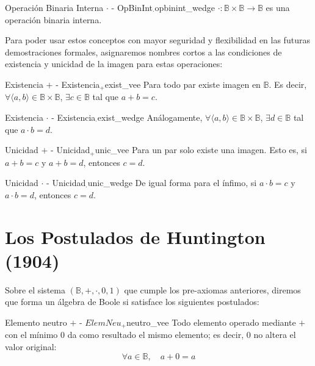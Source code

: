 \begin{preaxioma}{Operación Binaria Interna $\cdot$ - OpBinInt$_\cdot$}{opbinint_wedge}
$\cdot : \mathbb{B} \times \mathbb{B} \to \mathbb{B}$ es una operación binaria interna.
\end{preaxioma}

Para poder usar estos conceptos con mayor seguridad y flexibilidad en las futuras demostraciones formales, asignaremos nombres cortos a las condiciones de existencia y unicidad de la imagen para estas operaciones:

\begin{preaxioma}{Existencia $+$ - Existencia$_+$}{exist_vee}
Para todo par existe imagen en $\mathbb{B}$. Es decir, $\forall \langle a,b \rangle \in \mathbb{B} \times \mathbb{B}$, $\exists c \in \mathbb{B}$ tal que $a + b = c$.
\end{preaxioma}

\begin{preaxioma}{Existencia $\cdot$ - Existencia$_\cdot$}{exist_wedge}
Análogamente, $\forall \langle a,b \rangle \in \mathbb{B} \times \mathbb{B}$, $\exists d \in \mathbb{B}$ tal que $a \cdot b = d$.
\end{preaxioma}

\begin{preaxioma}{Unicidad $+$ - Unicidad$_+$}{unic_vee}
Para un par solo existe una imagen. Esto es, si $a + b = c$ y $a + b = d$, entonces $c = d$.
\end{preaxioma}

\begin{preaxioma}{Unicidad $\cdot$ - Unicidad$_\cdot$}{unic_wedge}
De igual forma para el ínfimo, si $a \cdot b = c$ y $a \cdot b = d$, entonces $c = d$.
\end{preaxioma}

\section{Los Postulados de Huntington (1904)}
Sobre el sistema $(\mathbb{B}, +, \cdot, 0, 1)$ que cumple los pre-axiomas anteriores, diremos que forma un álgebra de Boole si satisface los siguientes postulados:

\begin{postulado}{Elemento neutro $+$ - $ElemNeu_+$}{neutro_vee}
Todo elemento operado mediante $+$ con el mínimo $0$ da como resultado el mismo elemento; es decir, $0$ no altera el valor original:
\[ \forall a \in \mathbb{B}, \quad a + 0 = a \]
\end{postulado}

